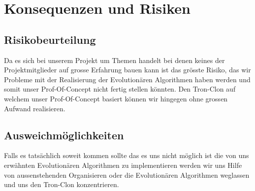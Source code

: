 \section{Konsequenzen und Risiken}
	
	\subsection{Risikobeurteilung}
	Da es sich bei unserem Projekt um Themen handelt bei denen keines der Projektmitglieder auf grosse Erfahrung bauen kann ist das grösste Risiko, das wir Probleme mit der Realisierung der Evolutionären Algorithmen haben werden und somit unser Prof-Of-Concept nicht fertig stellen könnten. 
	Den Tron-Clon auf welchem unser Prof-Of-Concept basiert können wir hingegen ohne grossen Aufwand realisieren.
	
	\subsection{Ausweichmöglichkeiten}
	Falls es tatsächlich soweit kommen sollte das es uns nicht möglich ist die von uns erwähnten Evolutionären Algorithmen zu implementieren werden wir uns Hilfe von aussenstehenden Organisieren oder die Evolutionären Algorithmen weglassen und uns den Tron-Clon konzentrieren. 